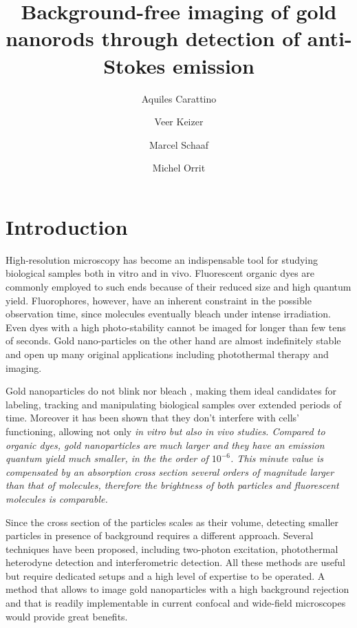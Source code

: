 \documentclass[journal=nalefd,manuscript=letter]{achemso}
\author{Aquiles Carattino}
\affiliation[Leiden]
{Huygens-Kamerlingh Onnes, Leiden, The Netherlands}
\author{Veer Keizer}
\affiliation[Leiden]
{Huygens-Kamerlingh Onnes, Leiden, The Netherlands}
\author{Marcel Schaaf}
\affiliation[Leiden]
{Huygens-Kamerlingh Onnes, Leiden, The Netherlands}
\author{Michel Orrit}
\affiliation[Leiden]
{Huygens-Kamerlingh Onnes Lab, 2300RA Leiden, The Netherlands}
\title{Background-free imaging of gold nanorods through detection of
anti-Stokes emission}
\begin{document}
\maketitle
{}
\section{Introduction}
High-resolution microscopy has become an indispensable tool for studying
biological samples both in vitro and in vivo\cite{Moerner2007}.
Fluorescent organic dyes are commonly employed to such ends because of their
reduced size and high quantum yield\cite{Lichtman2005}. Fluorophores, however,
have an inherent constraint  in the possible observation time, since molecules
eventually bleach under intense irradiation\cite{Shaner2005}. Even dyes with a
high photo-stability cannot be imaged for longer than few tens of seconds. Gold
nano-particles on the other hand are almost indefinitely stable\cite{Jana2001}
and open up many original applications including photothermal
therapy\cite{Alkilany2012} and imaging\cite{VandenBroek2013}.

Gold nanoparticles do not blink nor bleach\cite{PEREZJUSTE2005}
\cite{Mohamed2000}, making them ideal candidates for labeling, tracking and
manipulating biological samples over extended periods of time. Moreover it has
been shown that they don't interfere with cells' functioning\cite{Lewinski2008},
allowing not only \em{in vitro} but also \em{in vivo} studies. Compared to
organic dyes, gold nanoparticles are much larger and they have an emission
quantum yield much smaller, in the the order of $10^{-6}$\cite{Yorulmaz2012}.
This minute value is compensated by an absorption cross section several orders
of magnitude larger than that of molecules\cite{Link1999}, therefore the
brightness of both particles and fluorescent molecules is comparable.

Since the cross section of the particles scales as their volume, detecting
smaller particles in presence of background requires a different approach.
Several techniques have been proposed, including two-photon
excitation\cite{VandenBroek2013}, photothermal heterodyne
detection\cite{Berciaud2006} and interferometric detection\cite{Ignatovich2006}.
All these methods are useful but require dedicated setups and a high level of
expertise to be operated. A method that allows to image gold nanoparticles with
a high background rejection and that is readily implementable in current
confocal and wide-field microscopes would provide great benefits.
\end{document}
